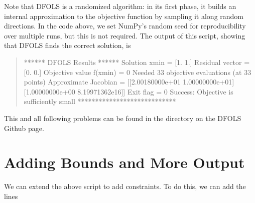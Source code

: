 \documentclass[letterpaper,10pt,english]{sphinxmanual}
\begin{document}
Note that DFO\sphinxhyphen{}LS is a randomized algorithm: in its first phase, it builds an internal approximation to the objective function by sampling it along random directions. In the code above, we set NumPy’s random seed for reproducibility over multiple runs, but this is not required. The output of this script, showing that DFO\sphinxhyphen{}LS finds the correct solution, is
\begin{quote}

\begin{sphinxVerbatim}[commandchars=\\\{\}]
****** DFO\PYGZhy{}LS Results ******
Solution xmin = [1. 1.]
Residual vector = [0. 0.]
Objective value f(xmin) = 0
Needed 33 objective evaluations (at 33 points)
Approximate Jacobian = [[\PYGZhy{}2.00180000e+01  1.00000000e+01]
 [\PYGZhy{}1.00000000e+00  8.19971362e\PYGZhy{}16]]
Exit flag = 0
Success: Objective is sufficiently small
****************************
\end{sphinxVerbatim}
\end{quote}

This and all following problems can be found in the  directory on the DFO\sphinxhyphen{}LS Github page.


\section{Adding Bounds and More Output}
\label{\detokenize{userguide:adding-bounds-and-more-output}}
We can extend the above script to add constraints. To do this, we can add the lines
\begin{quote}

\begin{sphinxVerbatim}[commandchars=\\\{\}]
  \PYG{p}{[} \PYG{p}{]}
  \PYG{p}{[} \PYG{p}{]}

     
\end{sphinxVerbatim}
\end{quote}
\end{document}
